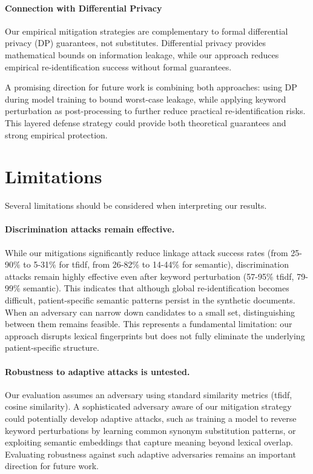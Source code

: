 \paragraph{Connection with Differential Privacy} Our empirical mitigation strategies are complementary to formal differential privacy (DP) guarantees, not substitutes. Differential privacy provides mathematical bounds on information leakage, while our approach reduces empirical re-identification success without formal guarantees.

A promising direction for future work is combining both approaches: using DP during model training to bound worst-case leakage, while applying keyword perturbation as post-processing to further reduce practical re-identification risks. This layered defense strategy could provide both theoretical guarantees and strong empirical protection.

\section{Limitations}

Several limitations should be considered when interpreting our results.

\paragraph{Discrimination attacks remain effective.} While our mitigations significantly reduce linkage attack success rates (from 25-90\% to 5-31\% for \gls{tfidf}, from 26-82\% to 14-44\% for semantic), discrimination attacks remain highly effective even after keyword perturbation (57-95\% \gls{tfidf}, 79-99\% semantic). This indicates that although global re-identification becomes difficult, patient-specific semantic patterns persist in the synthetic documents. When an adversary can narrow down candidates to a small set, distinguishing between them remains feasible. This represents a fundamental limitation: our approach disrupts lexical fingerprints but does not fully eliminate the underlying patient-specific structure.

\paragraph{Robustness to adaptive attacks is untested.} Our evaluation assumes an adversary using standard similarity metrics (\gls{tfidf}, cosine similarity). A sophisticated adversary aware of our mitigation strategy could potentially develop adaptive attacks, such as training a model to reverse keyword perturbations by learning common synonym substitution patterns, or exploiting semantic embeddings that capture meaning beyond lexical overlap. Evaluating robustness against such adaptive adversaries remains an important direction for future work.


